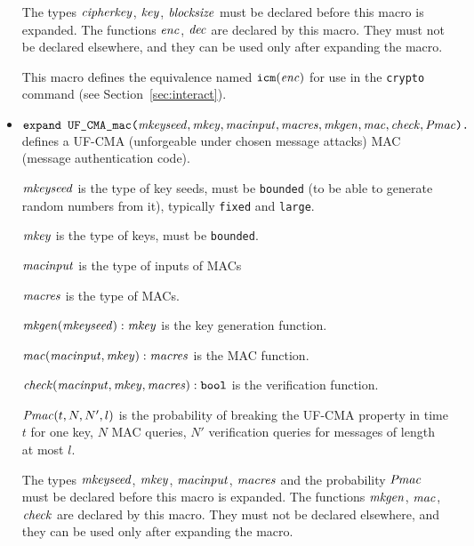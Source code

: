 \documentclass{article}
\begin{document}
\begin{itemize}


   
   The types $\mathit{cipherkey}$, $\mathit{key}$, $\mathit{blocksize}$ must be
   declared before this macro is expanded. The functions $\mathit{enc}$,
   $\mathit{dec}$ are declared by this macro. They must not be declared
   elsewhere, and they can be used only after expanding the macro.

   This macro defines the equivalence named $\texttt{icm}(\mathit{enc})$
   for use in the \texttt{crypto} command 
   (see Section~\ref{sec:interact}).

\item $\texttt{expand UF\_CMA\_mac(}\mathit{mkeyseed}, \mathit{mkey},
  \mathit{macinput}, \mathit{macres}, \mathit{mkgen}, \mathit{mac}, \mathit{check},
  \mathit{Pmac}\texttt{).}$ defines a UF-CMA (unforgeable under chosen
  message attacks) MAC (message authentication code).

   $\mathit{mkeyseed}$ is the type of key seeds, must be \texttt{bounded} (to
  be able to generate random numbers from it), typically
  \texttt{fixed} and \texttt{large}.

   $\mathit{mkey}$ is the type of keys, must be \texttt{bounded}.

   $\mathit{macinput}$ is the type of inputs of MACs

   $\mathit{macres}$ is the type of MACs.

   $\mathit{mkgen}(\mathit{mkeyseed}): \mathit{mkey}$ is the key generation function.

   $\mathit{mac}(\mathit{macinput}, \mathit{mkey}): \mathit{macres}$ is the MAC function.

   $\mathit{check}(\mathit{macinput}, \mathit{mkey}, \mathit{macres}): \texttt{bool}$ is the verification function.

   $\mathit{Pmac}(t, N, N', l)$ is the probability of breaking the UF-CMA
   property in time $t$ for one key, $N$ MAC queries, $N'$ verification
   queries for messages of length at most $l$.

   The types $\mathit{mkeyseed}$, $\mathit{mkey}$, $\mathit{macinput}$,
   $\mathit{macres}$ and the probability $\mathit{Pmac}$ must be declared
   before this macro is expanded. The functions $\mathit{mkgen}$,
   $\mathit{mac}$, $\mathit{check}$ are declared by this macro. They must not
   be declared elsewhere, and they can be used only after expanding
   the macro.


\end{itemize}
\end{document}
